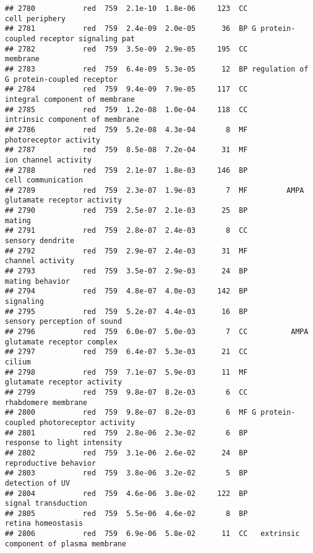 \documentclass[]{article}
\begin{document}
\begin{verbatim}
## 2780           red  759  2.1e-10  1.8e-06     123  CC                           cell periphery
## 2781           red  759  2.4e-09  2.0e-05      36  BP G protein-coupled receptor signaling pat
## 2782           red  759  3.5e-09  2.9e-05     195  CC                                 membrane
## 2783           red  759  6.4e-09  5.3e-05      12  BP regulation of G protein-coupled receptor
## 2784           red  759  9.4e-09  7.9e-05     117  CC           integral component of membrane
## 2785           red  759  1.2e-08  1.0e-04     118  CC          intrinsic component of membrane
## 2786           red  759  5.2e-08  4.3e-04       8  MF                   photoreceptor activity
## 2787           red  759  8.5e-08  7.2e-04      31  MF                     ion channel activity
## 2788           red  759  2.1e-07  1.8e-03     146  BP                       cell communication
## 2789           red  759  2.3e-07  1.9e-03       7  MF         AMPA glutamate receptor activity
## 2790           red  759  2.5e-07  2.1e-03      25  BP                                   mating
## 2791           red  759  2.8e-07  2.4e-03       8  CC                         sensory dendrite
## 2792           red  759  2.9e-07  2.4e-03      31  MF                         channel activity
## 2793           red  759  3.5e-07  2.9e-03      24  BP                          mating behavior
## 2794           red  759  4.8e-07  4.0e-03     142  BP                                signaling
## 2795           red  759  5.2e-07  4.4e-03      16  BP              sensory perception of sound
## 2796           red  759  6.0e-07  5.0e-03       7  CC          AMPA glutamate receptor complex
## 2797           red  759  6.4e-07  5.3e-03      21  CC                                   cilium
## 2798           red  759  7.1e-07  5.9e-03      11  MF              glutamate receptor activity
## 2799           red  759  9.8e-07  8.2e-03       6  CC                      rhabdomere membrane
## 2800           red  759  9.8e-07  8.2e-03       6  MF G protein-coupled photoreceptor activity
## 2801           red  759  2.8e-06  2.3e-02       6  BP              response to light intensity
## 2802           red  759  3.1e-06  2.6e-02      24  BP                    reproductive behavior
## 2803           red  759  3.8e-06  3.2e-02       5  BP                          detection of UV
## 2804           red  759  4.6e-06  3.8e-02     122  BP                      signal transduction
## 2805           red  759  5.5e-06  4.6e-02       8  BP                       retina homeostasis
## 2806           red  759  6.9e-06  5.8e-02      11  CC   extrinsic component of plasma membrane

\end{verbatim}
\end{document}
